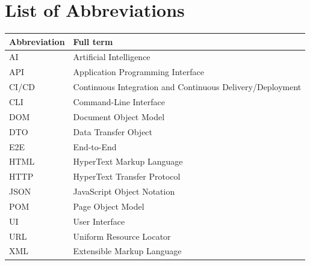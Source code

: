 \chapter*{List of Abbreviations}

\begin{center}
\tablefont
\begin{tabularx}{0.92\textwidth}{@{}lY@{}}
\toprule
\textbf{Abbreviation} & \textbf{Full term} \\
\midrule
AI & Artificial Intelligence \\
API & Application Programming Interface \\
CI/CD & Continuous Integration and Continuous Delivery/Deployment \\
CLI & Command-Line Interface \\
DOM & Document Object Model \\
DTO & Data Transfer Object \\
E2E & End-to-End \\
HTML & HyperText Markup Language \\
HTTP & HyperText Transfer Protocol \\
JSON & JavaScript Object Notation \\
POM & Page Object Model \\
UI & User Interface \\
URL & Uniform Resource Locator \\
XML & Extensible Markup Language \\
\bottomrule
\end{tabularx}
\end{center}
